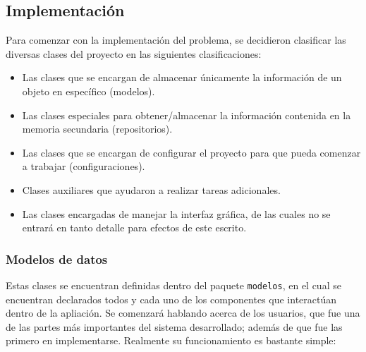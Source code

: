 \subsection*{Implementación}


Para comenzar con la implementación del problema, se decidieron clasificar las
diversas clases del proyecto en las siguientes clasificaciones:

\begin{itemize}
  \item Las clases que se encargan de almacenar únicamente la información de un objeto en específico (modelos).
  \item Las clases especiales para obtener/almacenar la información contenida en la memoria secundaria (repositorios).
  \item Las clases que se encargan de configurar el proyecto para que pueda comenzar a trabajar (configuraciones).
  \item Clases auxiliares que ayudaron a realizar tareas adicionales.
  \item Las clases encargadas de manejar la interfaz gráfica, de las cuales no se entrará en tanto detalle para efectos de este escrito.
\end{itemize}

\subsubsection*{Modelos de datos}

Estas clases se encuentran definidas dentro del paquete \texttt{modelos}, en el cual se encuentran declarados todos y cada
uno de los componentes que interactúan dentro de la apliación. Se comenzará hablando acerca de los usuarios, que fue una de
las partes más importantes del sistema desarrollado; además de que fue las primero en implementarse. Realmente su funcionamiento
es bastante simple:

